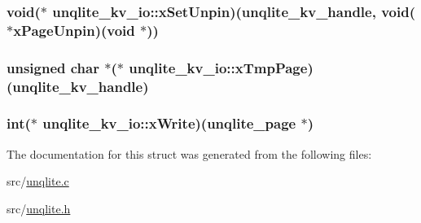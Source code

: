 \hypertarget{structunqlite__kv__io_a2afd5cd47890428732d515c001a915e5}{
\subsubsection[{x\-Set\-Unpin}]{\setlength{\rightskip}{0pt plus 5cm}void($\ast$ unqlite\-\_\-kv\-\_\-io\-::x\-Set\-Unpin)({\bf unqlite\-\_\-kv\-\_\-handle}, void($\ast$x\-Page\-Unpin)(void $\ast$))}}\label{dd/dc2/structunqlite__kv__io_a2afd5cd47890428732d515c001a915e5}
\hypertarget{structunqlite__kv__io_ae28ae64bdf58147094c1bec8dc9923e2}{
\subsubsection[{x\-Tmp\-Page}]{\setlength{\rightskip}{0pt plus 5cm}unsigned char $\ast$($\ast$ unqlite\-\_\-kv\-\_\-io\-::x\-Tmp\-Page)({\bf unqlite\-\_\-kv\-\_\-handle})}}\label{dd/dc2/structunqlite__kv__io_ae28ae64bdf58147094c1bec8dc9923e2}
\hypertarget{structunqlite__kv__io_a7e37a4e64daa4db394bc3b72a5c4085d}{
\subsubsection[{x\-Write}]{\setlength{\rightskip}{0pt plus 5cm}int($\ast$ unqlite\-\_\-kv\-\_\-io\-::x\-Write)({\bf unqlite\-\_\-page} $\ast$)}}\label{dd/dc2/structunqlite__kv__io_a7e37a4e64daa4db394bc3b72a5c4085d}


The documentation for this struct was generated from the following files\-:\begin{DoxyCompactItemize}
\item 
src/\hyperlink{unqlite_8c}{unqlite.\-c}\item 
src/\hyperlink{unqlite_8h}{unqlite.\-h}\end{DoxyCompactItemize}
